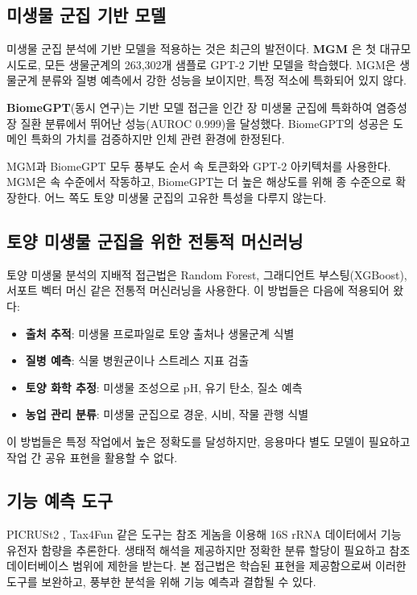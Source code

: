 \documentclass[11pt,a4paper]{article}
\begin{document}
\subsection{미생물 군집 기반 모델}

미생물 군집 분석에 기반 모델을 적용하는 것은 최근의 발전이다. \textbf{MGM} \citep{mgm2024}은 첫 대규모 시도로, 모든 생물군계의 263,302개 샘플로 GPT-2 기반 모델을 학습했다. MGM은 생물군계 분류와 질병 예측에서 강한 성능을 보이지만, 특정 적소에 특화되어 있지 않다.

\textbf{BiomeGPT}(동시 연구)는 기반 모델 접근을 인간 장 미생물 군집에 특화하여 염증성 장 질환 분류에서 뛰어난 성능(AUROC 0.999)을 달성했다. BiomeGPT의 성공은 도메인 특화의 가치를 검증하지만 인체 관련 환경에 한정된다.

MGM과 BiomeGPT 모두 풍부도 순서 속 토큰화와 GPT-2 아키텍처를 사용한다. MGM은 속 수준에서 작동하고, BiomeGPT는 더 높은 해상도를 위해 종 수준으로 확장한다. 어느 쪽도 토양 미생물 군집의 고유한 특성을 다루지 않는다.

\subsection{토양 미생물 군집을 위한 전통적 머신러닝}

토양 미생물 분석의 지배적 접근법은 Random Forest, 그래디언트 부스팅(XGBoost), 서포트 벡터 머신 같은 전통적 머신러닝을 사용한다. 이 방법들은 다음에 적용되어 왔다:

\begin{itemize}[leftmargin=1.5em]
    \item \textbf{출처 추적}: 미생물 프로파일로 토양 출처나 생물군계 식별 \citep{thompson2017communal}
    \item \textbf{질병 예측}: 식물 병원균이나 스트레스 지표 검출 \citep{naylor2017drought}
    \item \textbf{토양 화학 추정}: 미생물 조성으로 pH, 유기 탄소, 질소 예측
    \item \textbf{농업 관리 분류}: 미생물 군집으로 경운, 시비, 작물 관행 식별
\end{itemize}

이 방법들은 특정 작업에서 높은 정확도를 달성하지만, 응용마다 별도 모델이 필요하고 작업 간 공유 표현을 활용할 수 없다.

\subsection{기능 예측 도구}

PICRUSt2 \citep{douglas2020picrust2}, Tax4Fun 같은 도구는 참조 게놈을 이용해 16S rRNA 데이터에서 기능 유전자 함량을 추론한다. 생태적 해석을 제공하지만 정확한 분류 할당이 필요하고 참조 데이터베이스 범위에 제한을 받는다. 본 접근법은 학습된 표현을 제공함으로써 이러한 도구를 보완하고, 풍부한 분석을 위해 기능 예측과 결합될 수 있다.
\end{document}
